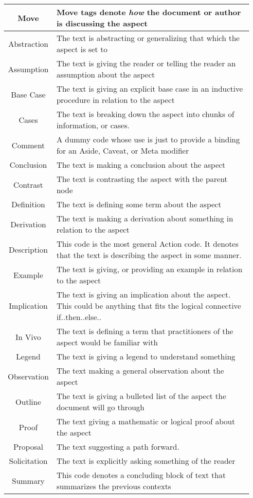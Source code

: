 \begin{table}[h!]
\begin{tabular}{c p{1.8\linewidth}}
    
    \textbf{Move} & Move tags denote \emph{how} the document or author is discussing the aspect\\
    \hline
    Abstraction & The text is abstracting or generalizing that which the aspect is set to\\
    Assumption & The text is giving the reader or telling the reader an assumption about the aspect \\
    Base Case & The text is giving an explicit base case in an inductive procedure in relation to the aspect\\
    Cases & The text is breaking down the aspect into chunks of information, or cases.\\
    Comment & A dummy code whose use is just to provide a binding for an Aside, Caveat, or Meta modifier\\
    Conclusion & The text is making a conclusion about the aspect\\
    Contrast &  The text is contrasting the aspect with the parent node \\
    Definition & The text is defining some term about the aspect\\
    Derivation & The text is making a derivation about something in relation to the aspect\\
    Description & This code is the most general Action code. It denotes that the text is describing the aspect in some manner.\\
    Example & The text is giving, or providing an example in relation to the aspect\\
    Implication & The text is giving an implication about the aspect. This could be anything that fits the logical connective if..then..else..\\
    In Vivo & The text is defining a term that practitioners of the aspect would be familiar with\\
    Legend & The text is giving a legend to understand something\\
    Observation & The text making a general observation about the aspect\\
    Outline & The text is giving a bulleted list of the aspect the document will go through\\
    Proof & The text giving a mathematic or logical proof about the aspect\\
    Proposal & The text suggesting a path forward.\\
    Solicitation & The text is explicitly asking something of the reader\\
    Summary & This code denotes a concluding block of text that summarizes the previous contexts\\


\end{tabular}
\end{table}
